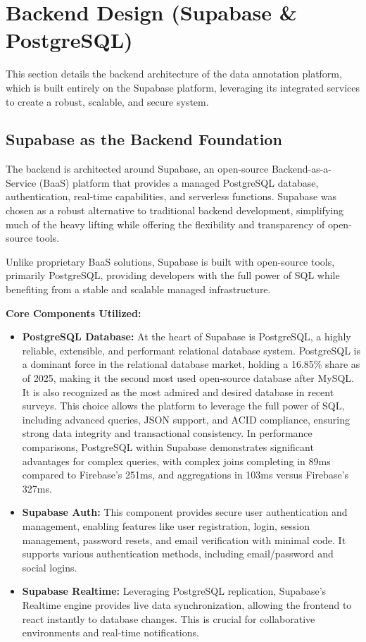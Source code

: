 \section{Backend Design (Supabase \& PostgreSQL)}

This section details the backend architecture of the data annotation platform, which is built entirely on the Supabase platform, leveraging its integrated services to create a robust, scalable, and secure system.

\subsection{Supabase as the Backend Foundation}

The backend is architected around Supabase, an open-source Backend-as-a-Service (BaaS) platform that provides a managed PostgreSQL database, authentication, real-time capabilities, and serverless functions. Supabase was chosen as a robust alternative to traditional backend development, simplifying much of the heavy lifting while offering the flexibility and transparency of open-source tools.

Unlike proprietary BaaS solutions, Supabase is built with open-source tools, primarily PostgreSQL, providing developers with the full power of SQL while benefiting from a stable and scalable managed infrastructure.

\textbf{Core Components Utilized:}
\begin{itemize}
    \item \textbf{PostgreSQL Database:} At the heart of Supabase is PostgreSQL, a highly reliable, extensible, and performant relational database system. PostgreSQL is a dominant force in the relational database market, holding a 16.85\% share as of 2025, making it the second most used open-source database after MySQL. It is also recognized as the most admired and desired database in recent surveys. This choice allows the platform to leverage the full power of SQL, including advanced queries, JSON support, and ACID compliance, ensuring strong data integrity and transactional consistency. In performance comparisons, PostgreSQL within Supabase demonstrates significant advantages for complex queries, with complex joins completing in 89ms compared to Firebase's 251ms, and aggregations in 103ms versus Firebase's 327ms.
    \item \textbf{Supabase Auth:} This component provides secure user authentication and management, enabling features like user registration, login, session management, password resets, and email verification with minimal code. It supports various authentication methods, including email/password and social logins.
    \item \textbf{Supabase Realtime:} Leveraging PostgreSQL replication, Supabase's Realtime engine provides live data synchronization, allowing the frontend to react instantly to database changes. This is crucial for collaborative environments and real-time notifications.
\end{itemize}

